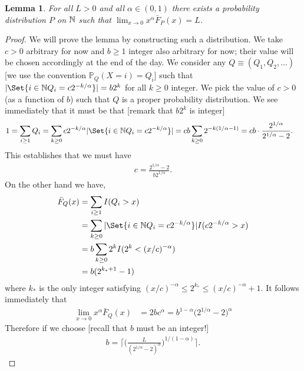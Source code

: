 \documentclass{article}
\newtheorem{lemma}{Lemma}
\newcommand{\1}{\boldsymbol{1}}
\newcommand{\PP}{\mathbb{P}}
\providecommand\given{} %
\theoremstyle{plain}
\begin{document}
\begin{lemma}
  \label{lem:2}
  For all $L > 0$ and all $\alpha \in (0,1)$ there exists a probability
  distribution $P$ on $\mathbb{N}$ such that $\lim_{x\to 0}x^{\alpha}\bar{F}_P(x) = L$.
\end{lemma}
\begin{proof}
  We will prove the lemma by constructing such a distribution. We take $c > 0$
  arbitrary for now and $b \geq 1$ integer also arbitrary for now; their value
  will be chosen accordingly at the end of the day. We consider any
  $Q \equiv (Q_1,Q_2,\dots)$ [we use the convention $\PP_Q(X = i) = Q_i$] such that
  $|\Set{i \in \Nats \given Q_i = c 2^{-k/\alpha}}| = b 2^{k}$ for all
  $k\geq 0$ integer. We
  pick the value of $c > 0$ (as a function of $b$) such that $Q$ is a proper
  probability distribution. We see immediately that it must be that [remark that
  $b 2^k$ is integer]
  \begin{align*}
    1
    &= \sum_{i\geq 1}Q_i%
    = \sum_{k\geq 0} c 2^{-k/\alpha}|\Set{i \in \Nats \given Q_i = c 2^{-k/\alpha}}|%
    = cb \sum_{k\geq 0}2^{-k(1/\alpha - 1)}%
    = cb \cdot \frac{2^{1/\alpha}}{2^{1/\alpha} - 2}.
  \end{align*}
  This establishes that we must have
  \begin{align*}
    c = \frac{2^{1/\alpha}-2}{b 2^{1/\alpha}}.
  \end{align*}
  On the other hand we have,
  \begin{align*}
    \bar{F}_Q(x)%
    &= \sum_{i\geq 1}I(Q_i > x)\\
    &= \sum_{k\geq 0}|\Set{i \in \Nats \given Q_i = c 2^{-k/\alpha}}|I(c 2^{-k/\alpha} > x)\\
    &= b \sum_{k\ge 0}2^kI(2^k < (x/c)^{-\alpha})\\
    &= b(2^{k_{*}+1} - 1)
  \end{align*}
  where $k_{*}$ is the only integer satisfying
  $(x/c)^{-\alpha} \leq 2^{k_{*}} \leq (x/c)^{-\alpha} + 1$. It follows
  immediately that
  \begin{align*}
    \lim_{x\to 0}x^{\alpha}\bar{F}_Q(x)%
    &= 2bc^{\alpha}%
      = b^{1-\alpha}\big(2^{1/\alpha} - 2 \big)^{\alpha}
  \end{align*}
  Therefore if we choose [recall that $b$ must be an integer!]
  \begin{align*}
    b = \Bigg\lceil \Big(\frac{L}{(2^{1/\alpha} - 2)^{\alpha}} \Big)^{1/(1-\alpha)} \Bigg\rceil.

\end{align*}
\end{proof}
\end{document}
